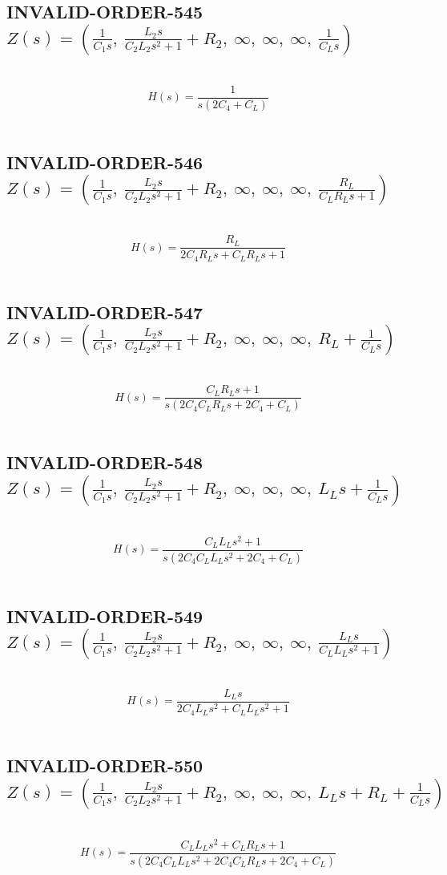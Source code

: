 \documentclass{article}
\begin{document}
\subsection{INVALID-ORDER-545 $Z(s) = \left( \frac{1}{C_{1} s}, \  \frac{L_{2} s}{C_{2} L_{2} s^{2} + 1} + R_{2}, \  \infty, \  \infty, \  \infty, \  \frac{1}{C_{L} s}\right)$ } \ 
\textbf{\[H(s) = \frac{1}{s \left(2 C_{4} + C_{L}\right)}\] } \ 
\subsection{INVALID-ORDER-546 $Z(s) = \left( \frac{1}{C_{1} s}, \  \frac{L_{2} s}{C_{2} L_{2} s^{2} + 1} + R_{2}, \  \infty, \  \infty, \  \infty, \  \frac{R_{L}}{C_{L} R_{L} s + 1}\right)$ } \ 
\textbf{\[H(s) = \frac{R_{L}}{2 C_{4} R_{L} s + C_{L} R_{L} s + 1}\] } \ 
\subsection{INVALID-ORDER-547 $Z(s) = \left( \frac{1}{C_{1} s}, \  \frac{L_{2} s}{C_{2} L_{2} s^{2} + 1} + R_{2}, \  \infty, \  \infty, \  \infty, \  R_{L} + \frac{1}{C_{L} s}\right)$ } \ 
\textbf{\[H(s) = \frac{C_{L} R_{L} s + 1}{s \left(2 C_{4} C_{L} R_{L} s + 2 C_{4} + C_{L}\right)}\] } \ 
\subsection{INVALID-ORDER-548 $Z(s) = \left( \frac{1}{C_{1} s}, \  \frac{L_{2} s}{C_{2} L_{2} s^{2} + 1} + R_{2}, \  \infty, \  \infty, \  \infty, \  L_{L} s + \frac{1}{C_{L} s}\right)$ } \ 
\textbf{\[H(s) = \frac{C_{L} L_{L} s^{2} + 1}{s \left(2 C_{4} C_{L} L_{L} s^{2} + 2 C_{4} + C_{L}\right)}\] } \ 
\subsection{INVALID-ORDER-549 $Z(s) = \left( \frac{1}{C_{1} s}, \  \frac{L_{2} s}{C_{2} L_{2} s^{2} + 1} + R_{2}, \  \infty, \  \infty, \  \infty, \  \frac{L_{L} s}{C_{L} L_{L} s^{2} + 1}\right)$ } \ 
\textbf{\[H(s) = \frac{L_{L} s}{2 C_{4} L_{L} s^{2} + C_{L} L_{L} s^{2} + 1}\] } \ 
\subsection{INVALID-ORDER-550 $Z(s) = \left( \frac{1}{C_{1} s}, \  \frac{L_{2} s}{C_{2} L_{2} s^{2} + 1} + R_{2}, \  \infty, \  \infty, \  \infty, \  L_{L} s + R_{L} + \frac{1}{C_{L} s}\right)$ } \ 
\textbf{\[H(s) = \frac{C_{L} L_{L} s^{2} + C_{L} R_{L} s + 1}{s \left(2 C_{4} C_{L} L_{L} s^{2} + 2 C_{4} C_{L} R_{L} s + 2 C_{4} + C_{L}\right)}\] } \ 
\end{document}
